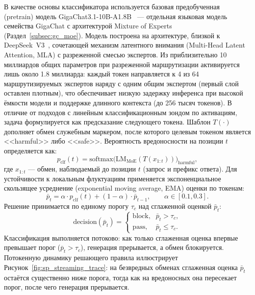 В качестве основы классификатора используется базовая предобученная (pretrain) модель GigaChat3.1-10B-A1.8B~\cite{gigachat3_10b} --- отдельная языковая модель семейства GigaChat с архитектурой Mixture of Experts (Раздел~\ref{subsec:gc_moe}).
Модель построена на архитектуре, близкой к DeepSeek~V3~\cite{deepseek2025v3}, сочетающей механизм латентного внимания (Multi-Head Latent Attention, MLA) с разреженной смесью экспертов.
Из приблизительно 10 миллиардов общих параметров при разреженной маршрутизации активируется лишь около 1.8 миллиарда: каждый токен направляется к 4 из 64 маршрутизируемых экспертов наряду с одним общим экспертом (первый слой оставлен плотным), что обеспечивает низкую задержку инференса при высокой ёмкости модели и поддержке длинного контекста (до 256 тысяч токенов).
В отличие от подходов с линейным классификационным зондом по активациям, задача формулируется как предсказание следующего токена.
Шаблон $T(\cdot)$ дополняет обмен служебным маркером, после которого целевым токеном является <<harmful>> либо <<safe>>.
Вероятность вредоносности на позиции $t$ определяется как:
\begin{equation}
\label{eq:sp_pclf}
    p_{\text{clf}}(t) = \mathrm{softmax}\big(\mathrm{LM}_{\text{MoE}}(T(x_{1:t}))\big)_{\text{harmful}},
\end{equation}
где $x_{1:t}$ --- обмен, наблюдаемый до позиции $t$ (запрос и префикс ответа).
Для устойчивости к локальным флуктуациям применяется экспоненциальное скользящее усреднение (exponential moving average, EMA) оценки по токенам:
\begin{equation}
\label{eq:sp_ema}
    \bar{p}_t = \alpha \cdot p_{\text{clf}}(t) + (1 - \alpha) \cdot \bar{p}_{t-1}, \qquad \alpha \in [0.1, 0.3].
\end{equation}
Решение принимается по единому порогу $\tau_c$ над сглаженной оценкой $\bar{p}_t$:
\begin{equation}
\label{eq:sp_decision}
    \mathrm{decision}(\bar{p}_t) =
    \begin{cases}
        \text{block}, & \bar{p}_t > \tau_c, \\
        \text{pass}, & \bar{p}_t \le \tau_c.
    \end{cases}
\end{equation}
Классификация выполняется потоково: как только сглаженная оценка впервые превышает порог ($\bar{p}_t > \tau_c$), генерация прерывается, а обмен блокируется.
Потокенную динамику решающего правила иллюстрирует Рисунок~\ref{fig:sp_streaming_trace}: на безвредных обменах сглаженная оценка $\bar{p}_t$ остаётся существенно ниже порога, тогда как на вредоносных она пересекает порог, после чего генерация прерывается.

